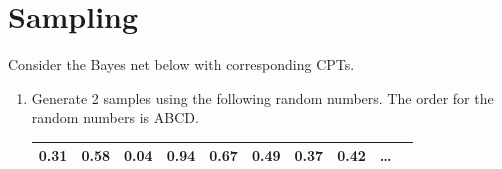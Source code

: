 \documentclass[12pt]{article}
\begin{document}
\clearpage

\section{Sampling}

Consider the Bayes net below with corresponding CPTs.  

\begin{enumerate}

\item Generate 2 samples using the following random numbers.  The
  order for the random numbers is ABCD.

\begin{center}
\begin{tabular}{|c|c|c|c|c|c|c|c|c|c|} \hline
0.31 & 0.58 & 0.04 & 0.94 & 0.67 & 0.49 & 0.37 & 0.42 & \ldots \\ \hline
\end{tabular}
\end{center}


\end{enumerate}
\end{document}
